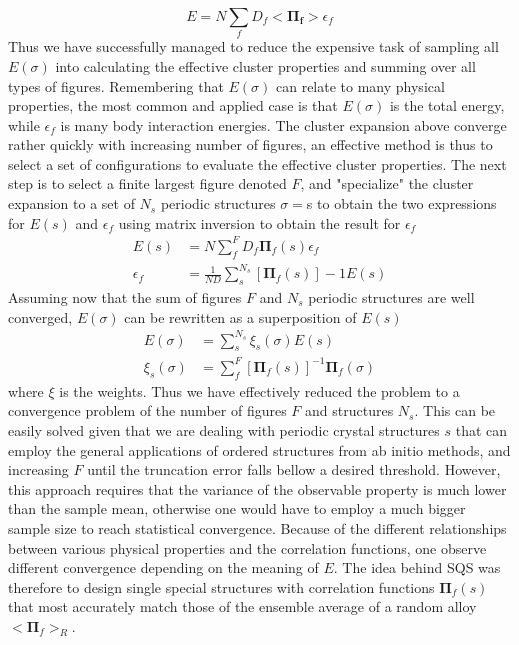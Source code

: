 \begin{equation}
    E = N\sum_f D_f<\boldsymbol{\Pi_f}>\epsilon_f
\end{equation}
Thus we have successfully managed to reduce the expensive task of sampling all $E(\sigma)$ into calculating the effective cluster properties and summing over all types of figures. Remembering that $E(\sigma)$ can relate to many physical properties, the most common and applied case is that $E(\sigma)$ is the total energy, while $\epsilon_f$ is many body interaction energies. The cluster expansion above converge rather quickly with increasing number of figures, an effective method is thus to select a set of configurations to evaluate the effective cluster properties. The next step is to select a finite largest figure denoted $F$, and "specialize" the cluster expansion to a set of $N_s$ periodic structures ${\sigma} = ${s} to obtain the two expressions for $E(s)$ and $\epsilon_f$ using matrix inversion to obtain the result for $\epsilon_f$
\begin{align}
E(s) &= N\sum_{f}^{F} D_f \boldsymbol{\Pi}_f (s)\epsilon_f \\     
\epsilon_f &= \frac{1}{ND}\sum_{s}^{N_s}[\boldsymbol{\Pi}_f (s)]-1E(s)
\end{align}
Assuming now that the sum of figures $F$ and $N_s$ periodic structures are well converged, $E(\sigma)$ can be rewritten as a superposition of $E(s)$
\begin{align}
    E(\sigma) &= \sum_{s}^{N_s}\xi_s(\sigma)E(s) \\
    \xi_s(\sigma) &= \sum_{f}^{F}[\boldsymbol{\Pi}_f(s)]^{-1}\boldsymbol{\Pi}_f(\sigma)    
\end{align}
where $\xi$ is the weights. Thus we have effectively reduced the problem to a convergence problem of the number of figures $F$ and structures $N_s$. This can be easily solved given that we are dealing with periodic crystal structures ${s}$ that can employ the general applications of ordered structures from ab initio methods, and increasing $F$ until the truncation error falls bellow a desired threshold. However, this approach requires that the variance of the observable property is much lower than the sample mean, otherwise one would have to employ a much bigger sample size to reach statistical convergence. Because of the different relationships between various physical properties and the correlation functions, one observe different convergence depending on the meaning of $E$. The idea behind SQS was therefore to design single special structures with correlation functions ${\boldsymbol{\Pi}_f(s)}$ that most accurately match those of the ensemble average of a random alloy $<\boldsymbol{\Pi}_f>_R$. 


